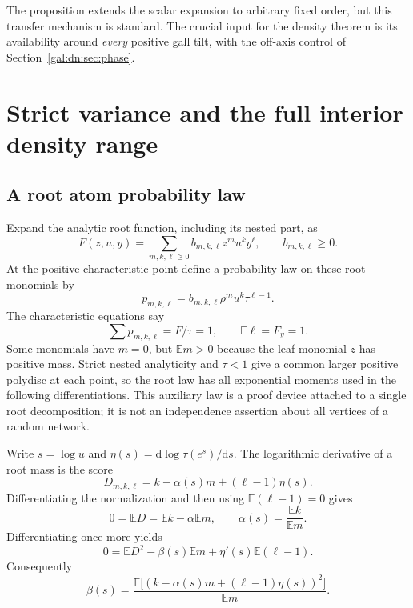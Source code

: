 \documentclass[11pt,letterpaper]{article}
\numberwithin{equation}{section}
\theoremstyle{definition}\newtheorem{definition}[theorem]{Definition}
\theoremstyle{remark}\newtheorem{remark}[theorem]{Remark}
\newcommand{\dd}{\mathrm d}
\newcommand{\E}{\mathbb E}
\begin{document}
The proposition extends the scalar expansion to arbitrary fixed order, but this transfer mechanism is standard. The crucial input for the density theorem is its availability around \emph{every} positive gall tilt, with the off-axis control of Section~\ref{gal:dn:sec:phase}.

\section{Strict variance and the full interior density range}\label{gal:dn:sec:variance}
\subsection{A root atom probability law}
Expand the analytic root function, including its nested part, as
\[
 F(z,u,y)=\sum_{m,k,\ell\geq0} b_{m,k,\ell}z^m u^k y^\ell,
 \qquad b_{m,k,\ell}\geq0.
\]
At the positive characteristic point define a probability law on these root monomials by
\begin{equation}\label{gal:dn:eq:patoms}
 p_{m,k,\ell}=b_{m,k,\ell}\rho^m u^k\tau^{\ell-1}.
\end{equation}
The characteristic equations say
\begin{equation}\label{gal:dn:eq:moments}
 \sum p_{m,k,\ell}=F/\tau=1,\qquad \E\ell=F_y=1.
\end{equation}
Some monomials have $m=0$, but $\E m>0$ because the leaf monomial $z$ has positive mass. Strict nested analyticity and $\tau<1$ give a common larger positive polydisc at each point, so the root law has all exponential moments used in the following differentiations. This auxiliary law is a proof device attached to a single root decomposition; it is not an independence assertion about all vertices of a random network.

Write $s=\log u$ and $\eta(s)=\dd\log\tau(e^s)/\dd s$. The logarithmic derivative of a root mass is the score
\begin{equation}\label{gal:dn:eq:score}
 D_{m,k,\ell}=k-\alpha(s)m+(\ell-1)\eta(s).
\end{equation}
Differentiating the normalization and then using $\E(\ell-1)=0$ gives
\[
 0=\E D=\E k-\alpha\E m,
 \qquad \alpha(s)=\frac{\E k}{\E m}.
\]
Differentiating once more yields
\[
 0=\E D^2-\beta(s)\E m+\eta'(s)\E(\ell-1).
\]
Consequently
\begin{equation}\label{gal:dn:eq:varianceidentity}
 \boxed{\displaystyle
 \beta(s)=\frac{\E\bigl[(k-\alpha(s)m+(\ell-1)\eta(s))^2\bigr]}{\E m}.}
\end{equation}
\end{document}
